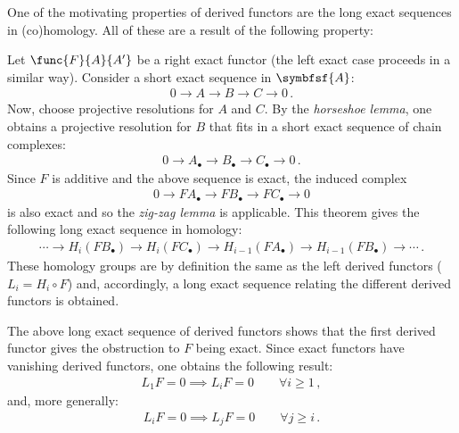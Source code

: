 	One of the motivating properties of derived functors are the long exact sequences in (co)homology. All of these are a result of the following property:
	\begin{property}
		Let $\func{F}{A}{A'}$ be a right exact functor (the left exact case proceeds in a similar way). Consider a short exact sequence in $\symbfsf{A}$:
		\begin{gather}
			0\longrightarrow A\longrightarrow B\longrightarrow C\longrightarrow 0\,.
		\end{gather}
		Now, choose projective resolutions for $A$ and $C$. By the \textit{horseshoe lemma}, one obtains a projective resolution for $B$ that fits in a short exact sequence of chain complexes:
		\begin{gather}
			0\longrightarrow A_\bullet\longrightarrow B_\bullet\longrightarrow C_\bullet\longrightarrow 0\,.
		\end{gather}
		Since $F$ is additive and the above sequence is exact, the induced complex
		\begin{gather}
			0\longrightarrow FA_\bullet\longrightarrow FB_\bullet\longrightarrow FC_\bullet\longrightarrow0
		\end{gather}
		is also exact and so the \textit{zig-zag lemma} is applicable. This theorem gives the following long exact sequence in homology:
		\begin{gather}
			\cdots\longrightarrow H_i(FB_\bullet)\longrightarrow H_i(FC_\bullet) \longrightarrow H_{i-1}(FA_\bullet) \longrightarrow H_{i-1}(FB_\bullet) \longrightarrow\cdots\,.
		\end{gather}
		These homology groups are by definition the same as the left derived functors ($L_i = H_i\circ F$) and, accordingly, a long exact sequence relating the different derived functors is obtained.
	\end{property}
	\begin{result}
		The above long exact sequence of derived functors shows that the first derived functor gives the obstruction to $F$ being exact. Since exact functors have vanishing derived functors, one obtains the following result:
		\begin{gather}
			L_1F = 0\implies L_iF=0\qquad\forall i\geq 1\,,
		\end{gather}
        and, more generally:
        \begin{gather}
            L_iF = 0\implies L_jF=0\qquad\forall j\geq i\,.
        \end{gather}
	\end{result}


